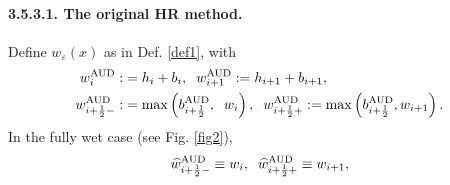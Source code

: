 \documentclass[11pt,a4paper,center,notitlepage]{article}
\numberwithin{equation}{section}
\begin{document}
\paragraph{3.5.3.1. The original HR method.} Define $w_\varepsilon \left(x\right)$ as in Def. \ref{def1}, with 
\begin{align}
w_i^{\rm AUD}: &= {h_i} + {b_i}, \hspace{2mm} w_{i + 1}^{\rm AUD}: = {h_{i + 1}} + {b_{i + 1}},\\
w_{i + \frac{1}{2} - }^{\rm AUD}: &= \max \left( {b_{i + \frac{1}{2}}^{\rm AUD},  \hspace{2mm} {w_i}} \right), \hspace{2mm} w_{i + \frac{1}{2} + }^{\rm AUD}: = \max \left( {b_{i + \frac{1}{2}}^{\rm AUD},{w_{i + 1}}} \right). \label{3.38}
\end{align}
In the fully wet case (see Fig. \ref{fig2}),
\begin{align}
\widehat w_{i + \frac{1}{2} - }^{\rm AUD} \equiv {w_i}, \hspace{2mm} \widehat w_{i + \frac{1}{2} + }^{\rm AUD} \equiv {w_{i + 1}},
\end{align}
\end{document}
